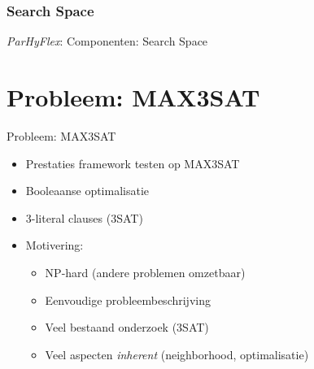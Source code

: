 \documentclass{beamer}
\newcommand{\parhyflexmech}{\node[draw=white,rectangle,minimum width=8 cm, minimum height=5 cm,fill=blue!20] (Machine) at (0,0) {};
\draw[black] ($(Machine.east)+(0,0.3)$) -- (Machine.north east) -| (Machine.south west) -| ($(Machine.east)+(0,-0.3)$);
\coordinate (OC) at (Machine.east);
\draw[dashed,->] (OC) to node[above,sloped]{\tiny World} ++(1,0);
\node[draw,rectangle,fill=gray!20,minimum width=4 cm, minimum height=0.5cm] (EXC) at (-1.8,2.05) {Execution Mechanism};
\node[draw,rectangle,fill=gray!20,minimum width=1 cm, minimum height=1cm] (EXP) at (3,1.8) {\tiny{Experience}};
\draw[orange,->] (EXC.east) to node[above]{\tiny Amnesia} (EXP.west |- EXC.east);
\node[draw,rectangle,fill=gray!20,minimum width=1 cm, minimum height=1cm] (NGT) at (3,-1.8) {\tiny{Negotiator}};
\draw[red,->] (EXP) to node[above,sloped]{\tiny Constraints} (NGT);
\draw[dashed,<-] (NGT.east) .. controls ($(NGT.east)+(1,0)$) and ($(OC)+(-1,0)$) .. (OC);
\node[draw,rectangle,fill=gray!20,minimum width=1 cm, minimum height=1cm] (SSP) at (0,-1.8) {\tiny{Search Space}};
\draw[red,->] (NGT) to node[above,sloped]{\tiny Constraints} (SSP);
\node[draw,dashed,rectangle,fill=gray!20,minimum width=0.5 cm, minimum height=0.5cm] (STA) at (1.5,1) {\tiny{State}};
\draw[dashed,<-] (STA.east) .. controls ($(STA.east)+(1,0)$) and ($(OC)+(-1,0)$) .. (OC);

\begin{scope}[xshift=-1.8 cm,yshift=0.55cm]
\node[draw,rectangle,fill=gray!20,minimum width=4 cm, minimum height=0.5cm] (MEM) at (0,0) {};
\foreach\x in {0,1,...,6} {
  \draw (0.5*\x-1.5,-0.25) -- ++(0,0.5);
}
\foreach\x in {2,...,7} {
  \draw[dotted,red!50!black] (MEM.south -| 0.5*\x-1.75,0) -- (SSP);
}
\foreach\x in {0,1} {
  \draw (0.5*\x-1.75,0) node {$s_{\x}$};
  \draw[<->] (MEM.north -| 0.5*\x-1.75,0) to node[sloped,above]{\tiny r/w} (EXC.south -| 0.5*\x-1.75,0);
  \draw[dashed] (MEM.south -| 0.5*\x-1.75,0) .. controls (0.5*\x-1.75,0.125*\x-1.75) and ($(OC)+(-3,0)$) .. (OC);
  \draw[->] (MEM.north -| 0.5*\x-1.625,0) .. controls (0.5*\x-1.625,-0.125*\x+0.75) and ($0.5*(EXP.west)+0.5*(EXP.south west)+(-3,0)$) .. ($0.5*(EXP.west)+0.5*(EXP.south west)$);
}
\foreach\x in {2,3} {
  \draw (0.5*\x-1.75,0) node {$s_{\x}$};
  \draw[->] (MEM.north -| 0.5*\x-1.75,0) to node[sloped,above]{\tiny read} (EXC.south -| 0.5*\x-1.75,0);
  \draw[<-,dashed] (MEM.south -| 0.5*\x-1.75,0) .. controls (0.5*\x-1.75,0.125*\x-1.75) and ($(OC)+(-3,0)$) .. (OC);
  \draw (0.5*\x-2,-0.25) -- ++(0.5,0.5);
}
\foreach\x in {4,5} {
  \draw (0.5*\x-1.75,0) node {$s_{\x}$};
  \draw[->] (MEM.north -| 0.5*\x-1.75,0) to node[sloped,above]{\tiny read} (EXC.south -| 0.5*\x-1.75,0);
  \draw[<-,dashed] (MEM.south -| 0.5*\x-1.75,0) .. controls (0.5*\x-1.75,0.125*\x-1.75) and ($(OC)+(-3,0)$) .. (OC);
  \draw (0.5*\x-2,0.25) -- ++(0.5,-0.5);
}
\foreach\x in {6,7} {
  \draw (0.5*\x-1.75,0) node {$s_{\x}$};
  \draw[->] (MEM.north -| 0.5*\x-1.75,0) to node[sloped,above]{\tiny read} (EXC.south -| 0.5*\x-1.75,0);
  \draw[<-,dashed] (MEM.south -| 0.5*\x-1.75,0) .. controls (0.5*\x-1.75,0.125*\x-1.75) and ($(OC)+(-3,0)$) .. (OC);
  \draw (0.5*\x-2,-0.25) -- ++(0.5,0.5);
  \draw (0.5*\x-2,0.25) -- ++(0.5,-0.5);
}
\end{scope}}
\begin{document}
\subsubsection{Search Space}
\begin{frame}{\emph{ParHyFlex}: Componenten: Search Space}
\begin{figure}
\end{figure}
\end{frame}
\section{Probleem: MAX3SAT}
\begin{frame}{Probleem: MAX3SAT}
\begin{itemize}[<+->]
 \item Prestaties framework testen op MAX3SAT
 \item Booleaanse optimalisatie
 \item 3-literal clauses (3SAT)
 \item Motivering:
 \begin{itemize}[<+->]
  \item NP-hard (andere problemen omzetbaar)
  \item Eenvoudige probleembeschrijving
  \item Veel bestaand onderzoek (3SAT)
  \item Veel aspecten \emph{inherent} (neighborhood, optimalisatie)
 \end{itemize}
\end{itemize}
\end{frame}
\end{document}
